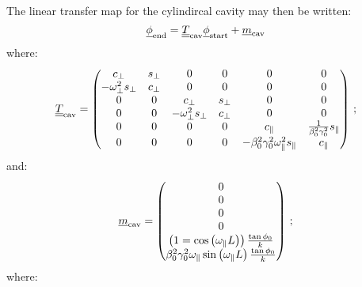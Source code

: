 The linear transfer map for the cylindircal cavity may then be
written:
\begin{equation}
  \underline{\phi}_{\rm end} = \underline{\underline{T}}_{\rm cav}
                              \underline{\phi}_{\rm start} +
                              \underline{m}_{\rm cav}
\end{equation}
where:
\begin{equation}
  \underline{\underline{T}}_{\rm cav} =
    \begin{pmatrix}
                       c_\perp & s_\perp &                      0 &      0 &                                                 0 &                                        0 \\
        -\omega_\perp^2 s_\perp & c_\perp &                      0 &      0 &                                                 0 &                                        0 \\
                            0 &       0 &                c_\perp & s_\perp &                                                 0 &                                        0 \\
                            0 &       0 & -\omega_\perp^2 s_\perp & c_\perp &                                                 0 &                                        0 \\
                            0 &       0 &                      0 &      0 &                                        c_\parallel & \frac{1}{\beta_0^2 \gamma_0^2} s_\parallel \\
                            0 &       0 &                      0 &      0 & -\beta_0^2 \gamma_0^2 \omega^2_\parallel s_\parallel & c_\parallel                                \\
        \end{pmatrix} \, ;
\end{equation}
and:
\begin{equation}
  \underline{m}_{\rm cav} = \begin{pmatrix} 0 \\ 0 \\ 0 \\ 0 \\
                                   \left( 1 = \cos\left( \omega_\parallel L \right) \right) \frac{\tan \phi_0}{k} \\
                                   \beta_0^2 \gamma_0^2 \omega_\parallel \sin\left(\omega_\parallel L \right) \frac{\tan \phi_0}{k} \\
                           \end{pmatrix} \, ;
\end{equation}
where:
